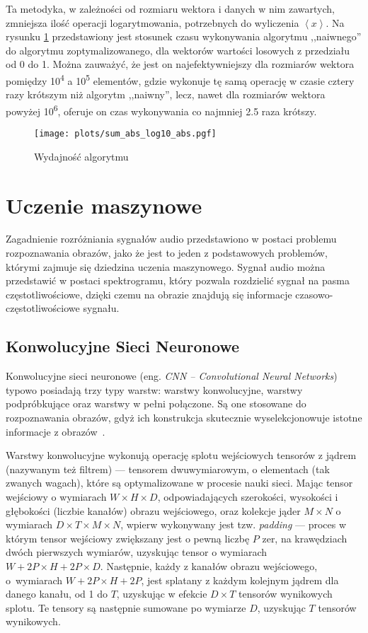 \documentclass[pl,12pt]{aghdpl}
\let\Oldsection\section%
\renewcommand{\section}{\FloatBarrier\Oldsection}
\let\Oldsubsection\subsection%
\renewcommand{\subsection}{\FloatBarrier\Oldsubsection}
\begin{document}
Ta metodyka, w zależności od rozmiaru wektora i danych w nim zawartych,
zmniejsza ilość operacji logarytmowania, potrzebnych do wyliczenia
$\left<x\right>$. Na rysunku \ref{fig:sum_abs_log_abs} przedstawiony jest
stosunek czasu wykonywania algorytmu ,,naiwnego'' do algorytmu
zoptymalizowanego, dla wektorów wartości losowych z przedziału od 0 do 1.
Można zauważyć, że jest on najefektywniejszy dla rozmiarów wektora pomiędzy
10\textsuperscript{4} a 10\textsuperscript{5} elementów, gdzie wykonuje tę
samą operację w czasie cztery razy krótszym niż algorytm ,,naiwny'', lecz, nawet
dla rozmiarów wektora powyżej 10\textsuperscript{6}, oferuje on czas wykonywania
co najmniej \num{2.5} raza krótszy.
\begin{figure}[!tbh]
  \centering
  \texttt{[image: plots/sum\_abs\_log10\_abs.pgf]}
  \caption{Wydajność algorytmu}
  \label{fig:sum_abs_log_abs}
\end{figure}

\section{Uczenie maszynowe}
Zagadnienie rozróżniania sygnałów audio przedstawiono w postaci problemu
rozpoznawania obrazów, jako że jest to jeden z podstawowych problemów, którymi
zajmuje się dziedzina uczenia maszynowego. Sygnał audio
można przedstawić w postaci spektrogramu, który pozwala rozdzielić
sygnał na pasma częstotliwościowe, dzięki czemu na obrazie znajdują się
informacje czasowo-częstotliwościowe sygnału.
\subsection{Konwolucyjne Sieci Neuronowe}
Konwolucyjne sieci neuronowe (eng. \textit{CNN -- Convolutional Neural
Networks}) typowo posiadają trzy typy warstw: warstwy konwolucyjne,
warstwy podpróbkujące oraz warstwy w pełni połączone. Są one stosowane do
rozpoznawania obrazów, gdyż ich konstrukcja skutecznie wyselekcjonowuje istotne
informacje z obrazów~\cite{DumoulinVisin2016}.

Warstwy konwolucyjne wykonują operację splotu wejściowych tensorów z jądrem
(nazywanym też filtrem) --- tensorem dwuwymiarowym, o elementach (tak zwanych
wagach), które są optymalizowane w procesie nauki sieci. Mając tensor wejściowy
o wymiarach $W \times H \times D$, odpowiadających szerokości, wysokości i
głębokości (liczbie kanałów) obrazu wejściowego, oraz kolekcje jąder $M \times
N$ o wymiarach $D \times T \times M \times N$, wpierw wykonywany jest tzw.
\textit{padding} --- proces w którym tensor wejściowy zwiększany jest o pewną
liczbę $P$ zer, na krawędziach dwóch pierwszych wymiarów, uzyskując tensor o
wymiarach $W+2P \times H+2P \times D$. Następnie, każdy z kanałów obrazu
wejściowego, o~wymiarach $W+2P \times H+2P$, jest splatany z każdym kolejnym
jądrem dla danego kanału, od 1 do $T$, uzyskując w efekcie $D\times T$ tensorów
wynikowych splotu. Te tensory są następnie sumowane po wymiarze $D$, uzyskując
$T$ tensorów wynikowych.
\end{document}
